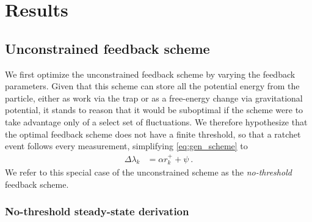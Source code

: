 \documentclass[%
reprint,
bibnotes, amsmath, amssymb, aps, pre,
 showkeys,
floatfix
]{revtex4-2}
\newcommand{\dlk}{\Delta\lambda_{k}}
\newcommand{\xkpr}{r_{k}^{+}}
\begin{document}
\section{Results}
\label{sec:results}

\subsection{Unconstrained feedback scheme}
\label{sec:full_extraction_scheme}
We first optimize the unconstrained feedback scheme by varying the feedback parameters.
Given that this scheme can store all the potential energy from the particle, either as work via the trap or as a free-energy change via gravitational potential, it stands to reason that it would be suboptimal if the scheme were to take advantage only of a select set of fluctuations.
We therefore hypothesize that the optimal feedback scheme does not have a finite threshold, so that a ratchet event follows every measurement, simplifying \eqref{eq:gen_scheme} to
\begin{align}
    \dlk &= \alpha\xkpr + \psi\ .\label{eq:natural_ansatz}
\end{align}
We refer to this special case of the unconstrained scheme as the \emph{no-threshold} feedback scheme.


\subsubsection{No-threshold steady-state derivation}
\end{document}
